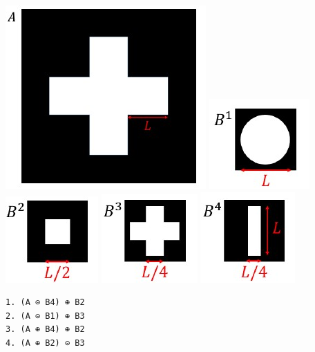 \documentclass[11pt]{article}
\makeatletter
\def\maxwidth{\ifdim\Gin@nat@width>\linewidth\linewidth
    \else\Gin@nat@width\fi}
\let\Oldincludegraphics\includegraphics
\renewcommand{\includegraphics}[1]{\Oldincludegraphics[width=.8\maxwidth]{#1}}
\makeatother
\begin{document}
\includegraphics{wiki/2_1.jpg} \includegraphics{wiki/2_2.jpg}
\includegraphics{wiki/2_3.jpg} \includegraphics{wiki/2_4.jpg}
\includegraphics{wiki/2_5.jpg}

\begin{verbatim}
1. (A ⊝ B4) ⊕ B2
2. (A ⊝ B1) ⊕ B3
3. (A ⊕ B4) ⊕ B2
4. (A ⊕ B2) ⊝ B3
\end{verbatim}
\end{document}
